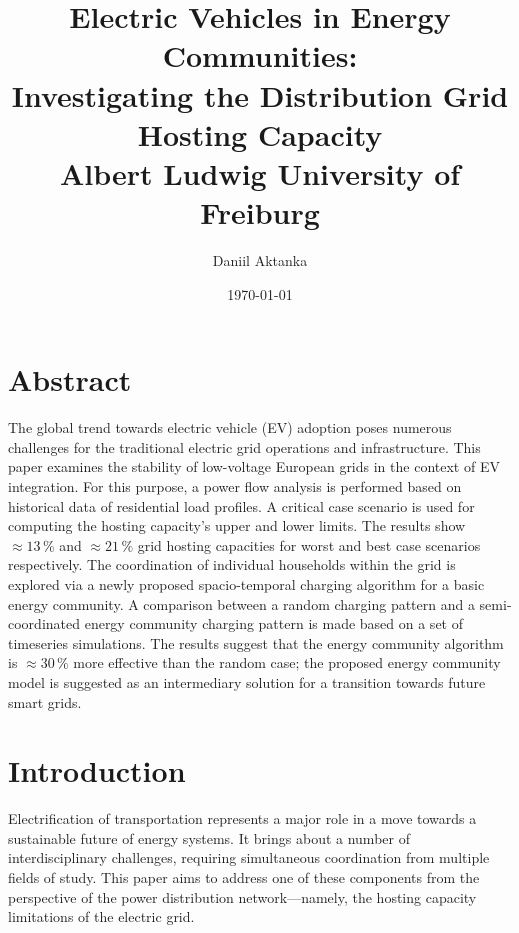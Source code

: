 \documentclass[a4paper,10pt]{report}
\begin{document}
\pagestyle{fancy}
\fancyhf{}
\fancyhead[R]{\small\leftmark\itshape\hfill\rightmark}
\fancyfoot[C]{\thepage}

\title{
	\vspace{2cm}
	{\LARGE Electric Vehicles in Energy Communities:}\\
	{\Large Investigating the Distribution Grid Hosting Capacity} \\[2cm]
	{\large Albert Ludwig University of Freiburg}
}
\author{
	\Large Daniil Aktanka
}
\date{
	\normalsize \today
}
\maketitle
\thispagestyle{empty}


\chapter*{Abstract}

The global trend towards electric vehicle (EV) adoption poses numerous challenges for the traditional electric grid operations and infrastructure. This paper examines the stability of low-voltage European grids in the context of EV integration. For this purpose, a power flow analysis is performed based on historical data of residential load profiles. A critical case scenario is used for computing the hosting capacity's upper and lower limits. The results show $\approx 13\,\%$ and $\approx 21\,\%$ grid hosting capacities for worst and best case scenarios respectively. The coordination of individual households within the grid is explored via a newly proposed spacio-temporal charging algorithm for a basic energy community.  A comparison between a random charging pattern and a semi-coordinated energy community charging pattern is made based on a set of timeseries simulations. The results suggest that the energy community algorithm is $\approx 30\,\%$ more effective than the random case; the proposed energy community model is suggested as an intermediary solution for a transition towards future smart grids.


\listoftables
{}
\cleardoublepage

\listoffigures
{}
\cleardoublepage

\tableofcontents\cleardoublepage



\chapter{Introduction}
Electrification of transportation represents a major role in a move towards a sustainable future of energy systems. It brings about a number of interdisciplinary challenges, requiring simultaneous coordination from multiple fields of study. This paper aims to address one of these components from the perspective of the power distribution network---namely, the hosting capacity limitations of the electric grid.
\end{document}
